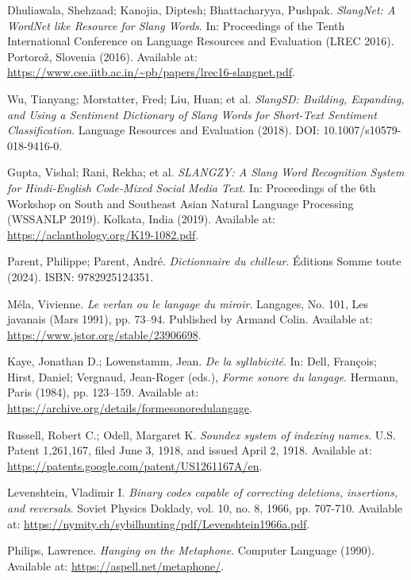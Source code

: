 \documentclass[12pt]{article}
\begin{document}
\begin{thebibliography}{9}
Dhuliawala, Shehzaad; Kanojia, Diptesh; Bhattacharyya, Pushpak.  
\textit{SlangNet: A WordNet like Resource for Slang Words}.  
In: Proceedings of the Tenth International Conference on Language Resources and Evaluation (LREC 2016).  
Portorož, Slovenia (2016).  
Available at: \url{https://www.cse.iitb.ac.in/~pb/papers/lrec16-slangnet.pdf}.

Wu, Tianyang; Morstatter, Fred; Liu, Huan; et al.  
\textit{SlangSD: Building, Expanding, and Using a Sentiment Dictionary of Slang Words for Short-Text Sentiment Classification}.  
Language Resources and Evaluation (2018).  
DOI: 10.1007/s10579-018-9416-0.  

Gupta, Vishal; Rani, Rekha; et al.  
\textit{SLANGZY: A Slang Word Recognition System for Hindi-English Code-Mixed Social Media Text}.  
In: Proceedings of the 6th Workshop on South and Southeast Asian Natural Language Processing (WSSANLP 2019).  
Kolkata, India (2019).  
Available at: \url{https://aclanthology.org/K19-1082.pdf}.

Parent, Philippe; Parent, André.  
\textit{Dictionnaire du chilleur}.  
Éditions Somme toute (2024).  
ISBN: 9782925124351.  

Méla, Vivienne.  
\textit{Le verlan ou le langage du miroir}.  
Langages, No. 101, Les javanais (Mars 1991), pp. 73–94.  
Published by Armand Colin.  
Available at: \url{https://www.jstor.org/stable/23906698}.

Kaye, Jonathan D.; Lowenstamm, Jean.  
\textit{De la syllabicité}.  
In: Dell, François; Hirst, Daniel; Vergnaud, Jean-Roger (eds.), \textit{Forme sonore du langage}.  
Hermann, Paris (1984), pp. 123–159.  
Available at: \url{https://archive.org/details/formesonoredulangage}.

Russell, Robert C.; Odell, Margaret K.  
\textit{Soundex system of indexing names}.  
U.S. Patent 1,261,167, filed June 3, 1918, and issued April 2, 1918.  
Available at: \url{https://patents.google.com/patent/US1261167A/en}.

Levenshtein, Vladimir I.  
\textit{Binary codes capable of correcting deletions, insertions, and reversals}.  
Soviet Physics Doklady, vol. 10, no. 8, 1966, pp. 707-710.  
Available at: \url{https://nymity.ch/sybilhunting/pdf/Levenshtein1966a.pdf}.

Philips, Lawrence.
\textit{Hanging on the Metaphone}.
Computer Language (1990).
Available at: \url{https://aspell.net/metaphone/}.


\end{thebibliography}
\end{document}
